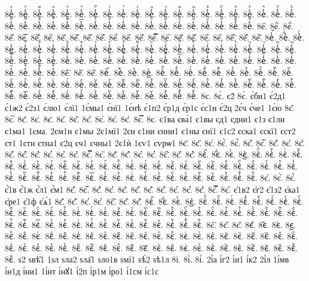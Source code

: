 {8ѐ҅ⷦ.
8ѐ҅ⷧ.
8ѐ҅ⷨ.
8ѐ҅ⷩ.
8ѐ҅ⷪ.
8ѐ҅ⷫ.
8ѐ҅ⷬ.
8ѐ҅ⷭ.
8ѐ҅ⷮ.
8ѐ҅ⷯ.
8ѐ҅ⷰ.
8ѐ҅ⷱ.
8ѐ҅ⷲ.
8ѐ҅ⷳ.
8ѐ҅ⷴ.
8ѐ҅ⷵ.
8ѐ҅ⷶ.
8ѐ҅ⷷ.
8ѐ҅ⷸ.
8ѐ҅ⷹ.
8ѐ҅ⷺ.
8ѐ҅ⷻ.
8ѐ҅ⷼ.
8ѐ҅ⷽ.
8ѐ҅ⷾ.
8ѐ҅ⷿ.
8ѐ҅꙯.
8ѐ҅ꙴ.
8ѐ҅ꙵ.
8ѐ҅ꙶ.
8ѐ҅ꙷ.
8ѐ҅ꙸ.
8ѐ҅ꙹ.
8ѐ҅ꙺ.
8ѐ҅ꙻ.
8ѐ҅꙼.
8ѐ҅꙽.
8ѐ҅ꚞ.
8ѐ҅ꚟ.
8ѐ҆.
8ѐ҆̀.
8ѐ҆́.
8ѐ҆̂.
8ѐ҆̅.
8ѐ҆̆.
8ѐ҆̇.
8ѐ҆̈.
8ѐ҆̋.
8ѐ҆̏.
8ѐ҆̑.
8ѐ҆̓.
8ѐ҆̔.
8ѐ҆̾.
8ѐ҆̿.
8ѐ҆͘.
8ѐ҆҃.
8ѐ҆҄.
8ѐ҆҅.
8ѐ҆҆.
8ѐ҆҇.
8ѐ҆᷀.
8ѐ҆᷁.
8ѐ҆᷶.
8ѐ᷷҆.
8ѐ᷸҆.
8ѐ᷹҆.
8ѐ҆ⷠ.
8ѐ҆ⷡ.
8ѐ҆ⷢ.
8ѐ҆ⷣ.
8ѐ҆ⷤ.
8ѐ҆ⷥ.
8ѐ҆ⷦ.
8ѐ҆ⷧ.
8ѐ҆ⷨ.
8ѐ҆ⷩ.
8ѐ҆ⷪ.
8ѐ҆ⷫ.
8ѐ҆ⷬ.
8ѐ҆ⷭ.
8ѐ҆ⷮ.
8ѐ҆ⷯ.
8ѐ҆ⷰ.
8ѐ҆ⷱ.
8ѐ҆ⷲ.
8ѐ҆ⷳ.
8ѐ҆ⷴ.
8ѐ҆ⷵ.
8ѐ҆ⷶ.
8ѐ҆ⷷ.
8ѐ҆ⷸ.
8ѐ҆ⷹ.
8ѐ҆ⷺ.
8ѐ҆ⷻ.
8ѐ҆ⷼ.
8ѐ҆ⷽ.
8ѐ҆ⷾ.
8ѐ҆ⷿ.
8ѐ҆꙯.
8ѐ҆ꙴ.
8ѐ҆ꙵ.
8ѐ҆ꙶ.
8ѐ҆ꙷ.
8ѐ҆ꙸ.
8ѐ҆ꙹ.
8ѐ҆ꙺ.
8ѐ҆ꙻ.
8ѐ҆꙼.
8ѐ҆꙽.
8ѐ҆ꚞ.
8ѐ҆ꚟ.
8ѐ҇.
8ѐ᷀.
8ѐ᷁.
8ѐ᷶.
8ѐ᷷.
8ѐ᷸.
8ѐ᷹.
8ѐⷠ.
8ѐⷡ.
8ѐⷢ.
8ѐⷣ.
8ѐⷤ.
8ѐⷥ.
8ѐⷦ.
8ѐⷧ.
8ѐⷨ.
8ѐⷩ.
8ѐⷪ.
8ѐⷫ.
8ѐⷬ.
8ѐⷭ.
8ѐⷮ.
8ѐⷯ.
8ѐⷰ.
8ѐⷱ.
8ѐⷲ.
8ѐⷳ.
8ѐⷴ.
8ѐⷵ.
8ѐⷶ.
8ѐⷷ.
8ѐⷸ.
8ѐⷹ.
8ѐⷺ.
8ѐⷻ.
8ѐⷼ.
8ѐⷽ.
8ѐⷾ.
8ѐⷿ.
8ѐ꙯.
8ѐꙴ.
8ѐꙵ.
8ѐꙶ.
8ѐꙷ.
8ѐꙸ.
8ѐꙹ.
8ѐꙺ.
8ѐꙻ.
8ѐ꙼.
8ѐ꙽.
8ѐꚞ.
8ѐꚟ.
8є.
8є̀.
є2́
8є́.
є́би1
є́2д1
є́1ж2
є́2з1
є́лю1
є́лї1
1є́мы1
є́нї1
1є́нѣ
є́1п2
є́р1д
є́р1с
є́с1н
є́2ц
2є́ч
є́че1
1є́ю
8є̂.
8є̅.
8є̆.
8є̇.
8є̈.
8є̋.
8є̏.
8є̑.
8є̓.
8є̔.
8є̾.
8є̿.
8є͘.
є1ва
єва́1
є1вы
єд1
єдни1
є1з
є1ли
є1ма1
1єма.
2єм1н
є1мы
2є1мї1
2єн
є1ни
єнни1
є1ны
єнї1
є1с2
єска1
єскї1
єст2
єт1
1єтн
єтна1
є2ц
єч1
єчны1
2є1ѝ
1єѵ1
єѵрѡ1
8є҃.
8є҄.
8є҅.
8є҅̀.
8є҅́.
8є҅̂.
8є҅̅.
8є҅̆.
8є҅̇.
8є҅̈.
8є҅̋.
8є҅̏.
8є҅̑.
8є҅̓.
8є҅̔.
8є҅̾.
8є҅̿.
8є҅͘.
8є҅҃.
8є҅҄.
8є҅҅.
8є҅҆.
8є҅҇.
8є҅᷀.
8є҅᷁.
8є҅᷶.
8є᷷҅.
8є᷸҅.
8є᷹҅.
8є҅ⷠ.
8є҅ⷡ.
8є҅ⷢ.
8є҅ⷣ.
8є҅ⷤ.
8є҅ⷥ.
8є҅ⷦ.
8є҅ⷧ.
8є҅ⷨ.
8є҅ⷩ.
8є҅ⷪ.
8є҅ⷫ.
8є҅ⷬ.
8є҅ⷭ.
8є҅ⷮ.
8є҅ⷯ.
8є҅ⷰ.
8є҅ⷱ.
8є҅ⷲ.
8є҅ⷳ.
8є҅ⷴ.
8є҅ⷵ.
8є҅ⷶ.
8є҅ⷷ.
8є҅ⷸ.
8є҅ⷹ.
8є҅ⷺ.
8є҅ⷻ.
8є҅ⷼ.
8є҅ⷽ.
8є҅ⷾ.
8є҅ⷿ.
8є҅꙯.
8є҅ꙴ.
8є҅ꙵ.
8є҅ꙶ.
8є҅ꙷ.
8є҅ꙸ.
8є҅ꙹ.
8є҅ꙺ.
8є҅ꙻ.
8є҅꙼.
8є҅꙽.
8є҅ꚞ.
8є҅ꚟ.
8є҆.
8є҆̀.
8є҆́.
є҆́1в
є҆́1ж
є҆́л1
є҆́м1
8є҆̂.
8є҆̅.
8є҆̆.
8є҆̇.
8є҆̈.
8є҆̋.
8є҆̏.
8є҆̑.
8є҆̓.
8є҆̔.
8є҆̾.
8є҆̿.
8є҆͘.
є҆1в2
є҆г2
є҆1з2
є҆ка1
є҆ре1
є҆1ф
є҆ѧ́1
8є҆҃.
8є҆҄.
8є҆҅.
8є҆҆.
8є҆҇.
8є҆᷀.
8є҆᷁.
8є҆᷶.
8є᷷҆.
8є᷸҆.
8є᷹҆.
8є҆ⷠ.
8є҆ⷡ.
8є҆ⷢ.
8є҆ⷣ.
8є҆ⷤ.
8є҆ⷥ.
8є҆ⷦ.
8є҆ⷧ.
8є҆ⷨ.
8є҆ⷩ.
8є҆ⷪ.
8є҆ⷫ.
8є҆ⷬ.
8є҆ⷭ.
8є҆ⷮ.
8є҆ⷯ.
8є҆ⷰ.
8є҆ⷱ.
8є҆ⷲ.
8є҆ⷳ.
8є҆ⷴ.
8є҆ⷵ.
8є҆ⷶ.
8є҆ⷷ.
8є҆ⷸ.
8є҆ⷹ.
8є҆ⷺ.
8є҆ⷻ.
8є҆ⷼ.
8є҆ⷽ.
8є҆ⷾ.
8є҆ⷿ.
8є҆꙯.
8є҆ꙴ.
8є҆ꙵ.
8є҆ꙶ.
8є҆ꙷ.
8є҆ꙸ.
8є҆ꙹ.
8є҆ꙺ.
8є҆ꙻ.
8є҆꙼.
8є҆꙽.
8є҆ꚞ.
8є҆ꚟ.
8є҇.
8є᷀.
8є᷁.
8є᷶.
8є᷷.
8є᷸.
8є᷹.
8єⷠ.
8єⷡ.
8єⷢ.
8єⷣ.
8єⷤ.
8єⷥ.
8єⷦ.
8єⷧ.
8єⷨ.
8єⷩ.
8єⷪ.
8єⷫ.
8єⷬ.
8єⷭ.
8єⷮ.
8єⷯ.
8єⷰ.
8єⷱ.
8єⷲ.
8єⷳ.
8єⷴ.
8єⷵ.
8єⷶ.
8єⷷ.
8єⷸ.
8єⷹ.
8єⷺ.
8єⷻ.
8єⷼ.
8єⷽ.
8єⷾ.
8єⷿ.
8є꙯.
8єꙴ.
8єꙵ.
8єꙶ.
8єꙷ.
8єꙸ.
8єꙹ.
8єꙺ.
8єꙻ.
8є꙼.
8є꙽.
8єꚞ.
8єꚟ.
ѕ2
ѕвѣ̑1
1ѕл
ѕла2
ѕла̑1
ѕло1в
ѕмї1
ѕѣ́2
ѕѣ1л
8і.
8і̀.
8і́.
2і́а
і́г2
і́и1
і́к2
2і́л
1і́мв
і́н1д
і́ни1
1і́нт
і́нꙋ1
і́2п
і́р1м
і́ро1
і́1см
і́с1с
}
